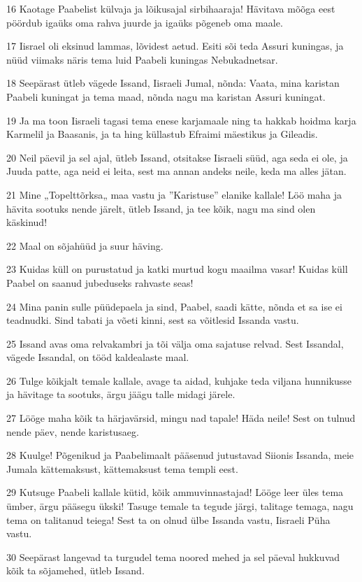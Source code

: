 \par 16 Kaotage Paabelist külvaja ja lõikusajal sirbihaaraja! Hävitava mõõga eest pöördub igaüks oma rahva juurde ja igaüks põgeneb oma maale.
\par 17 Iisrael oli eksinud lammas, lõvidest aetud. Esiti sõi teda Assuri kuningas, ja nüüd viimaks näris tema luid Paabeli kuningas Nebukadnetsar.
\par 18 Seepärast ütleb vägede Issand, Iisraeli Jumal, nõnda: Vaata, mina karistan Paabeli kuningat ja tema maad, nõnda nagu ma karistan Assuri kuningat.
\par 19 Ja ma toon Iisraeli tagasi tema enese karjamaale ning ta hakkab hoidma karja Karmelil ja Baasanis, ja ta hing küllastub Efraimi mäestikus ja Gileadis.
\par 20 Neil päevil ja sel ajal, ütleb Issand, otsitakse Iisraeli süüd, aga seda ei ole, ja Juuda patte, aga neid ei leita, sest ma annan andeks neile, keda ma alles jätan.
\par 21 Mine „Topelttõrksa„ maa vastu ja ”Karistuse” elanike kallale! Löö maha ja hävita sootuks nende järelt, ütleb Issand, ja tee kõik, nagu ma sind olen käskinud!
\par 22 Maal on sõjahüüd ja suur häving.
\par 23 Kuidas küll on purustatud ja katki murtud kogu maailma vasar! Kuidas küll Paabel on saanud jubeduseks rahvaste seas!
\par 24 Mina panin sulle püüdepaela ja sind, Paabel, saadi kätte, nõnda et sa ise ei teadnudki. Sind tabati ja võeti kinni, sest sa võitlesid Issanda vastu.
\par 25 Issand avas oma relvakambri ja tõi välja oma sajatuse relvad. Sest Issandal, vägede Issandal, on tööd kaldealaste maal.
\par 26 Tulge kõikjalt temale kallale, avage ta aidad, kuhjake teda viljana hunnikusse ja hävitage ta sootuks, ärgu jäägu talle midagi järele.
\par 27 Lööge maha kõik ta härjavärsid, mingu nad tapale! Häda neile! Sest on tulnud nende päev, nende karistusaeg.
\par 28 Kuulge! Põgenikud ja Paabelimaalt pääsenud jutustavad Siionis Issanda, meie Jumala kättemaksust, kättemaksust tema templi eest.
\par 29 Kutsuge Paabeli kallale kütid, kõik ammuvinnastajad! Lööge leer üles tema ümber, ärgu pääsegu ükski! Tasuge temale ta tegude järgi, talitage temaga, nagu tema on talitanud teiega! Sest ta on olnud ülbe Issanda vastu, Iisraeli Püha vastu.
\par 30 Seepärast langevad ta turgudel tema noored mehed ja sel päeval hukkuvad kõik ta sõjamehed, ütleb Issand.
